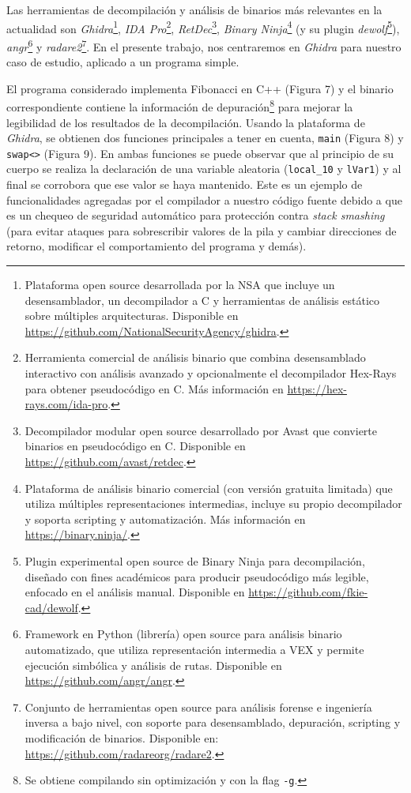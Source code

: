 \documentclass[runningheads]{llncs}
\begin{document}
Las herramientas de decompilación y análisis de binarios más relevantes en la actualidad son 
\textit{Ghidra}\footnote{Plataforma open source desarrollada por la NSA que incluye un desensamblador, 
un decompilador a C y herramientas de análisis estático sobre múltiples arquitecturas. Disponible 
en \url{https://github.com/NationalSecurityAgency/ghidra}.}, \textit{IDA Pro}\footnote{Herramienta 
comercial de análisis binario que combina desensamblado interactivo con análisis avanzado y 
opcionalmente el decompilador Hex-Rays para obtener pseudocódigo en C. Más información 
en \url{https://hex-rays.com/ida-pro}.}, \textit{RetDec}\footnote{Decompilador modular open source 
desarrollado por Avast que convierte binarios en pseudocódigo en C. Disponible 
en \url{https://github.com/avast/retdec}.}, \textit{Binary Ninja}\footnote{Plataforma de análisis 
binario comercial (con versión gratuita limitada) que utiliza múltiples representaciones intermedias, 
incluye su propio decompilador y soporta scripting y automatización. Más información 
en \url{https://binary.ninja/}.} (y su plugin \textit{dewolf}\footnote{Plugin experimental open 
source de Binary Ninja para decompilación, diseñado con fines académicos para producir pseudocódigo 
más legible, enfocado en el análisis manual. Disponible en \url{https://github.com/fkie-cad/dewolf}.}), 
\textit{angr}\footnote{Framework en Python (librería) open source para análisis binario automatizado, 
que utiliza representación intermedia a VEX y permite ejecución simbólica y análisis de rutas.
Disponible en \url{https://github.com/angr/angr}.} y \textit{radare2}\footnote{Conjunto de herramientas 
open source para análisis forense e ingeniería inversa a bajo nivel, con soporte para desensamblado,
depuración, scripting y modificación de binarios. Disponible en: 
\url{https://github.com/radareorg/radare2}.}. En el presente trabajo, nos centraremos en 
\textit{Ghidra} para nuestro caso de estudio, aplicado a un programa simple.

El programa considerado implementa Fibonacci en C++ (Figura 7) y el binario correspondiente contiene 
la información de depuración\footnote{Se obtiene compilando sin optimización y con la flag \texttt{-g}.}
para mejorar la legibilidad de los resultados de la decompilación. Usando la plataforma de \textit{Ghidra},
se obtienen dos funciones principales a tener en cuenta, \verb|main| (Figura 8) y \verb|swap<>| (Figura 9).
En ambas funciones se puede observar que al principio de su cuerpo se realiza la declaración de una variable 
aleatoria (\verb|local_10| y \verb|lVar1|) y al final se corrobora que ese valor se haya mantenido. 
Este es un ejemplo de funcionalidades agregadas por el compilador a nuestro código fuente debido a que 
es un chequeo de seguridad automático para protección contra \textit{stack smashing} (para evitar 
ataques para sobrescribir valores de la pila y cambiar direcciones de retorno, modificar el comportamiento 
del programa y demás).
\end{document}
